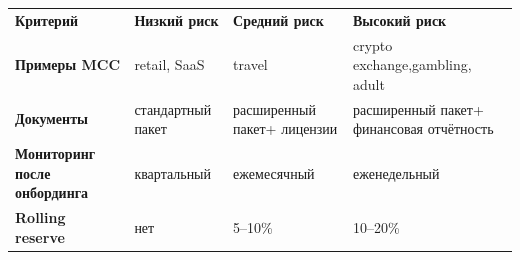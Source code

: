 \begingroup
\scriptsize
\renewcommand{\arraystretch}{1.28}

\begin{tabularx}{\textwidth}{
    >{\raggedright\arraybackslash\bfseries}p{}
    Y
    Y
    Y
  }
  Критерий                                 &
  \textbf{Низкий риск}  &
  \textbf{Средний риск} &
  \textbf{Высокий риск}           \\

  Примеры MCC                              &
  retail, SaaS                             &
  travel                                   &
  crypto exchange,\newline gambling, adult          \\

  Документы                                &
  стандартный пакет                        &
  расширенный пакет\newline + лицензии     &
  расширенный пакет\newline + финансовая отчётность \\

  Мониторинг после онбординга              &
  квартальный                              &
  ежемесячный                              &
  еженедельный                                      \\

  Rolling reserve                          &
  нет                                      &
  5--10\%                                  &
  10--20\%                                          \\[0.45ex]
\end{tabularx}

\endgroup
